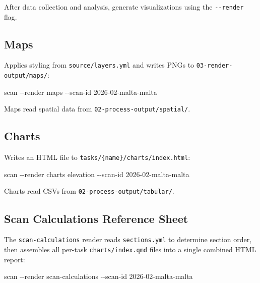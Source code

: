 \documentclass[
  letterpaper,
  DIV=11,
  numbers=noendperiod]{scrreprt}
\newenvironment{Shaded}{\begin{snugshade}}{\end{snugshade}}
\newcommand{\AttributeTok}[1]{\textcolor[rgb]{0.40,0.45,0.13}{#1}}
\newcommand{\ExtensionTok}[1]{\textcolor[rgb]{0.00,0.23,0.31}{#1}}
\newcommand{\NormalTok}[1]{\textcolor[rgb]{0.00,0.23,0.31}{#1}}
\begin{document}
After data collection and analysis, generate visualizations using the
\texttt{-\/-render} flag.

\subsection{Maps}\label{maps}

Applies styling from \texttt{source/layers.yml} and writes PNGs to
\texttt{03-render-output/maps/}:

\begin{Shaded}
\begin{Highlighting}[]
\ExtensionTok{scan} \AttributeTok{{-}{-}render}\NormalTok{ maps }\AttributeTok{{-}{-}scan{-}id}\NormalTok{ 2026{-}02{-}malta{-}malta}
\end{Highlighting}
\end{Shaded}

Maps read spatial data from \texttt{02-process-output/spatial/}.

\subsection{Charts}\label{charts}

Writes an HTML file to \texttt{tasks/\{name\}/charts/index.html}:

\begin{Shaded}
\begin{Highlighting}[]
\ExtensionTok{scan} \AttributeTok{{-}{-}render}\NormalTok{ charts elevation }\AttributeTok{{-}{-}scan{-}id}\NormalTok{ 2026{-}02{-}malta{-}malta}
\end{Highlighting}
\end{Shaded}

Charts read CSVs from \texttt{02-process-output/tabular/}.

\subsection{Scan Calculations Reference
Sheet}\label{scan-calculations-reference-sheet}

The \texttt{scan-calculations} render reads \texttt{sections.yml} to
determine section order, then assembles all per-task
\texttt{charts/index.qmd} files into a single combined HTML report:

\begin{Shaded}
\begin{Highlighting}[]
\ExtensionTok{scan} \AttributeTok{{-}{-}render}\NormalTok{ scan{-}calculations }\AttributeTok{{-}{-}scan{-}id}\NormalTok{ 2026{-}02{-}malta{-}malta}
\end{Highlighting}
\end{Shaded}
\end{document}
